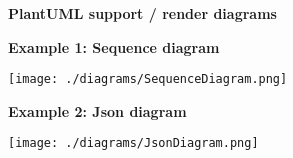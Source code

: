 %



%

\textbf{PlantUML support / render diagrams}

\vspace{2ex}

\textbf{Example 1: Sequence diagram}

\texttt{[image: ./diagrams/SequenceDiagram.png]}

\vspace{2ex}

\textbf{Example 2: Json diagram}

\texttt{[image: ./diagrams/JsonDiagram.png]}

